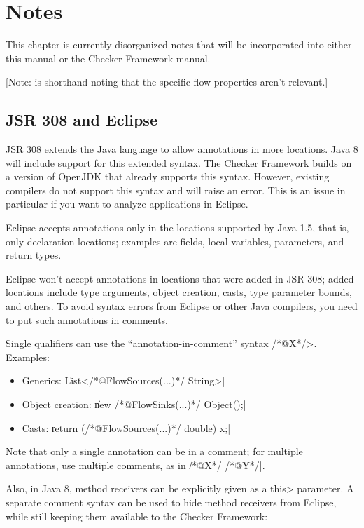 \htmlhr
\chapter{Notes\label{notes}}

This chapter is currently disorganized notes that will be incorporated into
either this manual or the Checker Framework manual.

[Note: \srcsome{} is shorthand noting that the specific flow
properties aren't relevant.]


\section{JSR 308 and Eclipse}

JSR 308 extends the Java language to allow annotations in more
locations. Java 8 will include support for this extended syntax.
The Checker Framework builds on a version of OpenJDK that already
supports this syntax.
However, existing compilers do not support this syntax and will raise
an error. This is an issue in particular if you want to analyze
applications in Eclipse.

Eclipse accepts annotations only in the locations supported by Java
1.5, that is, only declaration locations; examples are fields, local
variables, parameters, and return types.

Eclipse won't accept annotations in locations that were added in
JSR 308; added locations include type arguments, object creation,
casts, type parameter bounds, and others.
To avoid syntax errors from Eclipse or other Java compilers, you need
to put such annotations in comments.

Single qualifiers can use the ``annotation-in-comment'' syntax
\</*@X*/>. Examples:

\begin{itemize}
\item Generics:
	\|List</*@FlowSources(...)*/ String>|

\item Object creation:
	\|new /*@FlowSinks(...)*/ Object();|

\item Casts:
	\|return (/*@FlowSources(...)*/ double) x;|
\end{itemize}

Note that only a single annotation can be in a comment; for
multiple annotations, use multiple comments, as in \|/*@X*/ /*@Y*/|.

Also, in Java 8, method receivers can be explicitly given as a \<this>
parameter.
A separate comment syntax can be used to hide method receivers from
Eclipse, while still keeping them available to the Checker Framework:

